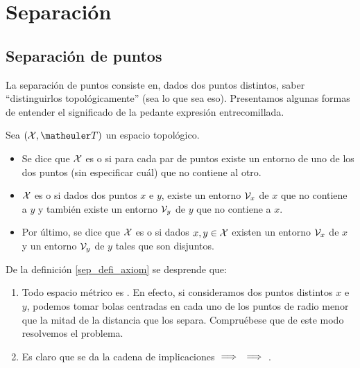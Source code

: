 \chapter{Separación}

\section{Separación de puntos} 

La separación de puntos consiste en, dados dos puntos distintos, saber ``distinguirlos topológicamente'' (sea lo que sea eso). Presentamos algunas formas de entender el significado de la pedante expresión entrecomillada.
\begin{defi}
	\label{sep_defi_axiom}
Sea $(\X,\T)$ un espacio topológico.
\begin{itemize}
\item Se dice que $\mathcal{X}$ es \kolmogorov o  si para cada par de puntos existe un entorno de uno de los dos puntos (sin especificar cuál) que no contiene al otro.  
\item $\mathcal{X}$ es \frechet o  si dados dos puntos $x$ e $y$, existe un entorno $\mathcal{V}_x$ de $x$ que no contiene a $y$ y también existe un entorno $\mathcal{V}_y$ de $y$ que no contiene a $x$.  
\item Por último, se dice que $\mathcal{X}$ es \hausdorff o  si dados $x,y\in\mathcal{X}$ existen un entorno $\mathcal{V}_x$ de $x$ y un entorno $\mathcal{V}_y$ de $y$ tales que son disjuntos.  
\end{itemize}
\end{defi}

\begin{obs}
	De la definición \ref{sep_defi_axiom} se desprende que:
	\begin{enumerate}
		\item Todo espacio métrico es \hausdorff. En efecto, si consideramos dos puntos distintos $x$ e $y$, podemos tomar bolas centradas en cada uno de los puntos de radio menor que la mitad de la distancia que los separa. Compruébese que de este modo resolvemos el problema.
		\item Es claro que se da la cadena de implicaciones
			\hausdorff $\implies$ \frechet $\implies$ \kolmogorov.\qedhere
	\end{enumerate}  
\end{obs}

